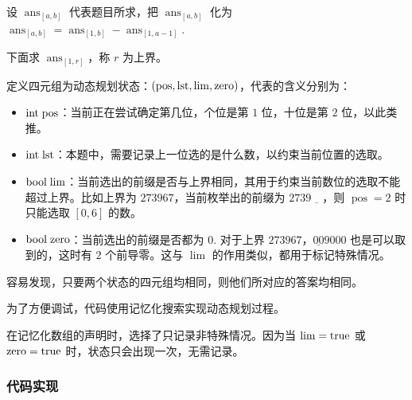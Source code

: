 设 \(\operatorname{ans}_{[a,b]}\) 代表题目所求，把
\(\operatorname{ans}_{[a,b]}\) 化为
\(\operatorname{ans}_{[a,b]}=\operatorname{ans}_{[1,b]}-\operatorname{ans}_{[1,a-1]}\).

下面求 \(\operatorname{ans}_{[1,r]}\)，称 \(r\) 为上界。

定义四元组为动态规划状态：\(\rm{(pos,lst,lim,zero)}\)，代表的含义分别为：

\begin{itemize}
\tightlist
\item
  \(\rm{int\;pos}\)：当前正在尝试确定第几位，个位是第 \(1\) 位，十位是第
  \(2\) 位，以此类推。
\item
  \(\rm{int \;lst}\)：本题中，需要记录上一位选的是什么数，以约束当前位置的选取。
\item
  \(\rm{bool\;lim}\)：当前选出的前缀是否与上界相同，其用于约束当前数位的选取不能超过上界。比如上界为
  \(273967\)，当前枚举出的前缀为 \(2739\underline{\quad}\)，则
  \(\operatorname{pos}=2\) 时只能选取 \([0,6]\) 的数。
\item
  \(\rm{bool\;zero}\)：当前选出的前缀是否都为 \(0\). 对于上界
  \(273967\)，\(\underline{00}9000\) 也是可以取到的，这时有 \(2\)
  个前导零。这与 \(\operatorname{lim}\) 的作用类似，都用于标记特殊情况。
\end{itemize}

容易发现，只要两个状态的四元组均相同，则他们所对应的答案均相同。

为了方便调试，代码使用记忆化搜索实现动态规划过程。

在记忆化数组的声明时，选择了只记录非特殊情况。因为当 \(\rm lim=true\) 或
\(\rm zero=true\) 时，状态只会出现一次，无需记录。

\subsubsection{代码实现}

